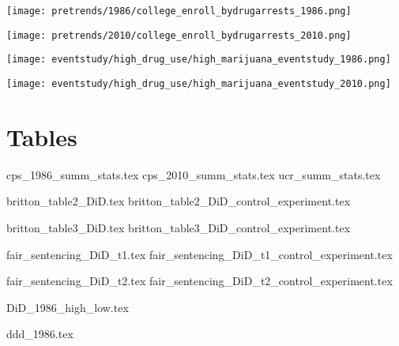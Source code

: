 \documentclass{article}
\begin{document}
\texttt{[image: pretrends/1986/college\_enroll\_bydrugarrests\_1986.png]}

\texttt{[image: pretrends/2010/college\_enroll\_bydrugarrests\_2010.png]}

\texttt{[image: eventstudy/high\_drug\_use/high\_marijuana\_eventstudy\_1986.png]}

\texttt{[image: eventstudy/high\_drug\_use/high\_marijuana\_eventstudy\_2010.png]}


\section*{Tables}
{cps_1986_summ_stats.tex}
{cps_2010_summ_stats.tex}
{ucr_summ_stats.tex}


{britton_table2_DiD.tex}
{britton_table2_DiD_control_experiment.tex}

{britton_table3_DiD.tex}
{britton_table3_DiD_control_experiment.tex}

{fair_sentencing_DiD_t1.tex}
{fair_sentencing_DiD_t1_control_experiment.tex}

{fair_sentencing_DiD_t2.tex}
{fair_sentencing_DiD_t2_control_experiment.tex}

{DiD_1986_high_low.tex}

{ddd_1986.tex}



\clearpage
\nocite{*}
\singlespacing




\clearpage
\end{document}
